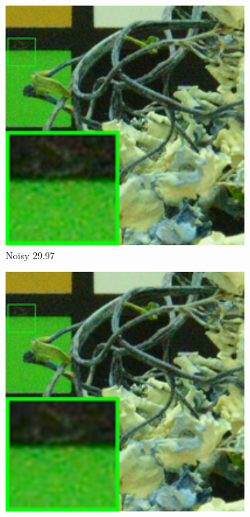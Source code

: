 \begin{figure}
    \centering
    \begin{subfigure}[t]{0.19\textwidth}
        \centering
        \includegraphics[width=1\textwidth]{images/mcwnnm/cc/resize_br_Noisy_d800_iso6400_2.png}
		\caption{Noisy 29.97}
    \end{subfigure}
    \hfill
    \begin{subfigure}[t]{0.19\textwidth}
        \centering
        \includegraphics[width=1\textwidth]{images/mcwnnm/cc/resize_br_CBM3D_CC15_d800_iso6400_2.png}

\end{subfigure}
\end{figure}
